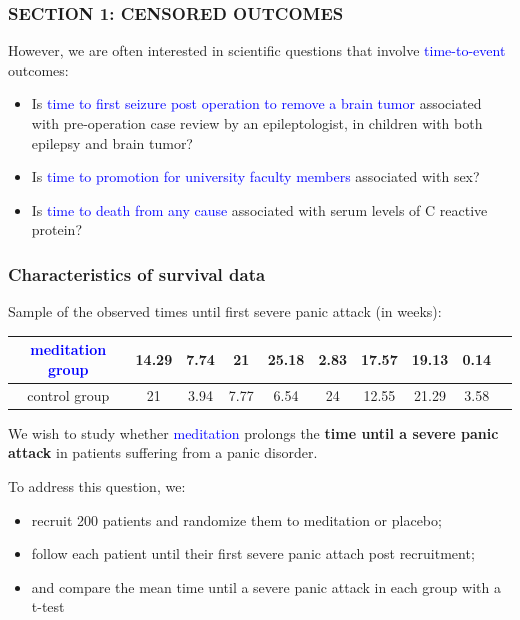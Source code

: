 \documentclass[12pt, 
hyperref={colorlinks=true, linkcolor=blue, urlcolor=cyan},dvipsnames]{beamer}
\begin{document}
\begin{frame}
\frametitle{SECTION 1: CENSORED OUTCOMES}
However, we are often interested in scientific questions that involve \textcolor{blue}{time-to-event} outcomes:
\begin{itemize}
\item Is \textcolor{blue}{time to first seizure post operation to remove a brain tumor} associated with pre-operation case review by an epileptologist, in children with both epilepsy and brain tumor?
\item Is \textcolor{blue}{time to promotion for university faculty members} associated with sex?
\item Is \textcolor{blue}{time to death from any cause} associated with serum levels of C reactive protein?
\end{itemize}
\end{frame}

\begin{frame}
\frametitle{Characteristics of survival data}
{\fontsize{10pt}{7.2}\selectfont
Sample of the observed times until first severe panic attack (in weeks):
\hspace*{-1cm}\begin{tabular}{|c|c|c|c|c|c|c|c|c|c|}
\hline
\textcolor{blue}{meditation group} & 14.29 & 7.74 & 21 & 25.18 & 2.83 & 17.57 & 19.13 & 0.14  \\
\hline
control group & 21 & 3.94 & 7.77 & 6.54 & 24 & 12.55 & 21.29 & 3.58 \\
\hline
\end{tabular}
}

We wish to study whether \textcolor{blue}{meditation} prolongs the \textbf{time until a severe panic attack} in patients suffering from a panic disorder.

To address this question, we: \vspace{-0.3cm}
\begin{itemize}
\item recruit 200 patients and randomize them to meditation or placebo;
\item follow each patient until their first severe panic attach post recruitment;
\item and compare the mean time until a severe panic attack in each group with a t-test
\end{itemize}

\end{frame}
\end{document}
